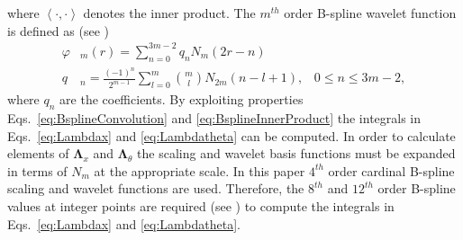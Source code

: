 \documentclass[journal,a4paper]{IEEEtran}
\begin{document}
where $\left\langle \cdot,\cdot\right\rangle $ denotes the inner product. The $m^{th}$ order B-spline wavelet function is defined as (see \cite{Chui1992}) 
\begin{align}
 \varphi & _{m}\left(r\right) = \sum_{n=0}^{3m-2} q_n N_{m}\left(2r-n\right) \\
 q & _n = \frac{\left(-1\right)^n}{2^{m-1}} \sum_{l=0}^{m} \binom{m}{l} N_{2m}\left(n-l+1\right), \,  \text{ $0\le n\le 3m-2$},
\end{align}
where $q_n$ are the coefficients. By exploiting properties Eqs.~\ref{eq:BsplineConvolution} and \ref{eq:BsplineInnerProduct} the integrals in Eqs.~\ref{eq:Lambdax} and \ref{eq:Lambdatheta} can be computed. In order to calculate elements of $\boldsymbol\Lambda_{x}$ and $\boldsymbol\Lambda_{\theta}$ the scaling and wavelet basis functions must be expanded in terms of $N_m$ at the appropriate scale.  In this paper $4^{th}$ order cardinal B-spline scaling and wavelet functions are used. Therefore, the $8^{th}$ and $12^{th}$ order B-spline values at integer points are required (see \cite{Goswami1999}) to compute the integrals in Eqs.~\ref{eq:Lambdax} and \ref{eq:Lambdatheta}.
\end{document}
